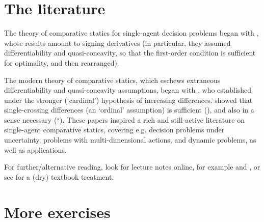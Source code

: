 \section{The literature}
\label{mcs:lit}

The theory of comparative statics for single-agent decision problems began with \textcite{Hicks1939,Samuelson1947}, whose results amount to signing derivatives (in particular, they assumed differentiability and quasi-concavity, so that the first-order condition is sufficient for optimality, and then rearranged).

The modern theory of comparative statics, which eschews extraneous differentiability and quasi-concavity assumptions, began with \textcite{Topkis1978}, who established  under the stronger (`cardinal') hypothesis of increasing differences. \textcite{MilgromShannon1994,LicalziVeinott1992} showed that single-crossing differences (an `ordinal' assumption) is sufficient (), and also in a sense necessary (\hyperref[theorem:topkis_ms_converse]{$^\star$}). These papers inspired a rich and still-active literature on single-agent comparative statics, covering e.g. decision problems under uncertainty, problems with multi-dimensional actions, and dynamic problems, as well as applications.

For further/alternative reading, look for lecture notes online, for example \textcite[sections~1--2 and 5]{Sarver2023} and \textcite{Tian2024}, or see \textcite[chapter~2]{Topkis1998} for a (dry) textbook treatment.



\section{More exercises}
\label{mcs:exer}

